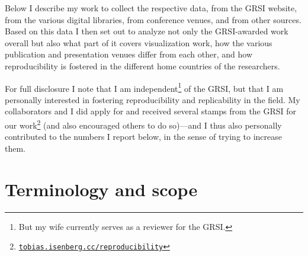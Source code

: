 \documentclass[conference]{vgtc}                     %
\begin{document}
\addtocounter{footnote}{-1}
\addtocounter{footnote}{1}

Below I describe my work to collect the respective data, from the GRSI website, from the various digital libraries, from conference venues, and from other sources. Based on this data I then set out to analyze not only the GRSI-awarded work overall but also what part of it covers visualization work, how the various publication and presentation venues differ from each other, and how reproducibility is fostered in the different home countries of the researchers.

For full disclosure I note that I am independent\footnote{But my wife currently serves as a reviewer for the GRSI.} of the GRSI, but that I am personally interested in fostering reproducibility and replicability in the field. My collaborators and I did apply for and received several stamps from the GRSI for our work\footnote{\href{https://tobias.isenberg.cc/reproducibility}{\texttt{tobias.isenberg.cc/reproducibility}}} (and also encouraged others to do so)---and I thus also personally contributed to the numbers I report below, in the sense of trying to increase them.

\section{Terminology and scope}
\label{sec:terminology}
\end{document}

